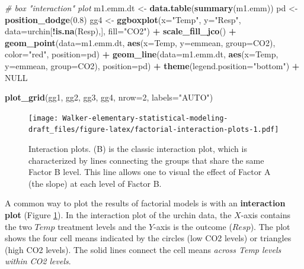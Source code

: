\documentclass[]{book}
\newenvironment{Shaded}{\begin{snugshade}}{\end{snugshade}}
\newcommand{\CommentTok}[1]{\textcolor[rgb]{0.56,0.35,0.01}{\textit{#1}}}
\newcommand{\DataTypeTok}[1]{\textcolor[rgb]{0.13,0.29,0.53}{#1}}
\newcommand{\DecValTok}[1]{\textcolor[rgb]{0.00,0.00,0.81}{#1}}
\newcommand{\FloatTok}[1]{\textcolor[rgb]{0.00,0.00,0.81}{#1}}
\newcommand{\KeywordTok}[1]{\textcolor[rgb]{0.13,0.29,0.53}{\textbf{#1}}}
\newcommand{\NormalTok}[1]{#1}
\newcommand{\OperatorTok}[1]{\textcolor[rgb]{0.81,0.36,0.00}{\textbf{#1}}}
\newcommand{\OtherTok}[1]{\textcolor[rgb]{0.56,0.35,0.01}{#1}}
\newcommand{\StringTok}[1]{\textcolor[rgb]{0.31,0.60,0.02}{#1}}
\begin{document}
\begin{Shaded}
\begin{Highlighting}[]
\CommentTok{# box "interaction" plot}
\NormalTok{m1.emm.dt <-}\StringTok{ }\KeywordTok{data.table}\NormalTok{(}\KeywordTok{summary}\NormalTok{(m1.emm))}
\NormalTok{pd <-}\StringTok{ }\KeywordTok{position_dodge}\NormalTok{(}\FloatTok{0.8}\NormalTok{)}
\NormalTok{gg4 <-}\StringTok{ }\KeywordTok{ggboxplot}\NormalTok{(}\DataTypeTok{x=}\StringTok{"Temp"}\NormalTok{,}
          \DataTypeTok{y=}\StringTok{"Resp"}\NormalTok{,}
          \DataTypeTok{data=}\NormalTok{urchin[}\OperatorTok{!}\KeywordTok{is.na}\NormalTok{(Resp),],}
          \DataTypeTok{fill=}\StringTok{"CO2"}\NormalTok{) }\OperatorTok{+}
\StringTok{  }\KeywordTok{scale_fill_jco}\NormalTok{() }\OperatorTok{+}
\StringTok{  }\KeywordTok{geom_point}\NormalTok{(}\DataTypeTok{data=}\NormalTok{m1.emm.dt, }
             \KeywordTok{aes}\NormalTok{(}\DataTypeTok{x=}\NormalTok{Temp, }\DataTypeTok{y=}\NormalTok{emmean, }\DataTypeTok{group=}\NormalTok{CO2),}
             \DataTypeTok{color=}\StringTok{"red"}\NormalTok{,}
             \DataTypeTok{position=}\NormalTok{pd) }\OperatorTok{+}
\StringTok{  }\KeywordTok{geom_line}\NormalTok{(}\DataTypeTok{data=}\NormalTok{m1.emm.dt, }
            \KeywordTok{aes}\NormalTok{(}\DataTypeTok{x=}\NormalTok{Temp, }\DataTypeTok{y=}\NormalTok{emmean, }\DataTypeTok{group=}\NormalTok{CO2),}
            \DataTypeTok{position=}\NormalTok{pd) }\OperatorTok{+}
\StringTok{  }\KeywordTok{theme}\NormalTok{(}\DataTypeTok{legend.position=}\StringTok{"bottom"}\NormalTok{) }\OperatorTok{+}
\StringTok{  }\OtherTok{NULL}

\KeywordTok{plot_grid}\NormalTok{(gg1, gg2, gg3, gg4, }\DataTypeTok{nrow=}\DecValTok{2}\NormalTok{, }\DataTypeTok{labels=}\StringTok{"AUTO"}\NormalTok{)}
\end{Highlighting}
\end{Shaded}

\begin{figure}
\centering
\texttt{[image: Walker-elementary-statistical-modeling-draft\_files/figure-latex/factorial-interaction-plots-1.pdf]}
\caption{\label{fig:factorial-interaction-plots}Interaction plots. (B) is the classic interaction plot, which is characterized by lines connecting the groups that share the same Factor B level. This line allows one to visual the effect of Factor A (the slope) at each level of Factor B.}
\end{figure}

A common way to plot the results of factorial models is with an \textbf{interaction plot} (Figure \ref{fig:factorial-interaction-plots}). In the interaction plot of the urchin data, the \(X\)-axis contains the two \(Temp\) treatment levels and the \(Y\)-axis is the outcome (\(Resp\)). The plot shows the four cell means indicated by the circles (low CO2 levels) or triangles (high CO2 levels). The solid lines connect the cell means \emph{across Temp levels within CO2 levels}.
\end{document}
